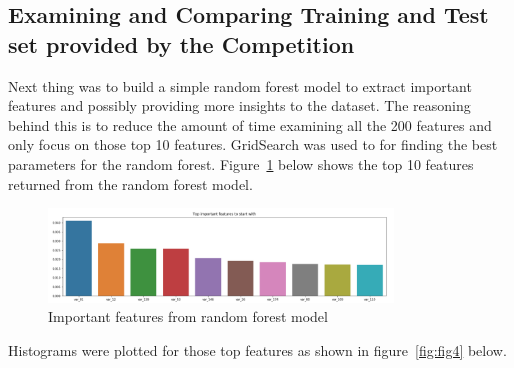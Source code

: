 \documentclass[journal,twoside,web]{ieeecolor}
\begin{document}

\subsection{Examining and Comparing Training and Test set provided by the Competition}

Next thing was to build a simple random forest model to extract important features and possibly providing more insights to the dataset. The reasoning behind this is to reduce the amount of time examining all the 200 features and only focus on those top 10 features. GridSearch was used to for finding the best parameters for the random forest. Figure~\ref{fig:fig3} below shows the top 10 features returned from the random forest model. 
\begin{figure}[h!]
  \centering
  \includegraphics[width=3.6in]{project/code/important features.png}
  \caption{Important features from random forest model}
  \label{fig:fig3}
\end{figure}

Histograms were plotted for those top features as shown in figure~\ref{fig:fig4} below.
\end{document}
